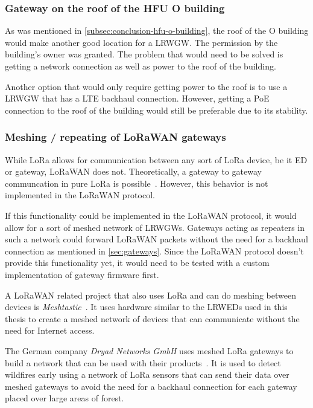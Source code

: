 \subsubsection{Gateway on the roof of the \acl{HFU} O building}

As was mentioned in \cref{subsec:conclusion-hfu-o-building}, the roof of the O building would make another good location for a \acl{LRWGW}.
The permission by the building's owner was granted.
The problem that would need to be solved is getting a network connection as well as power to the roof of the building.

Another option that would only require getting power to the roof is to use a \acl{LRWGW} that has a \ac{LTE} backhaul connection.
However, getting a \ac{PoE} connection to the roof of the building would still be preferable due to its stability.

\subsubsection{Meshing / repeating of \acs{LoRaWAN} gateways}

While \ac{LoRa} allows for communication between any sort of \ac{LoRa} device, be it \acl{ED} or gateway, \ac{LoRaWAN} does not.
Theoretically, a gateway to gateway communcation in pure \ac{LoRa} is possible~\cite{dwijaksara_multihop_2019}.
However, this behavior is not implemented in the \ac{LoRaWAN} protocol.

If this functionality could be implemented in the \ac{LoRaWAN} protocol, it would allow for a sort of meshed network of \aclp{LRWGW}.
Gateways acting as repeaters in such a network could forward \ac{LoRaWAN} packets without the need for a backhaul connection as mentioned in \cref{sec:gateways}.
Since the \ac{LoRaWAN} protocol doesn't provide this functionality yet, it would need to be tested with a custom implementation of gateway firmware first.

A \ac{LoRaWAN} related project that also uses \ac{LoRa} and can do meshing between devices is \emph{Meshtastic}~\cite{meshtastic_llc_meshtastic_2023}.
It uses hardware similar to the \aclp{LRWED} used in this thesis to create a meshed network of devices that can communicate without the need for Internet access.

The German company \emph{Dryad Networks GmbH} uses meshed \ac{LoRa} gateways to build a network that can be used with their products~\cite{dryad_networks_gmbh_silvanet_2023}.
It is used to detect wildfires early using a network of \ac{LoRa} sensors that can send their data over meshed gateways to avoid the need for a backhaul connection for each gateway placed over large areas of forest.

